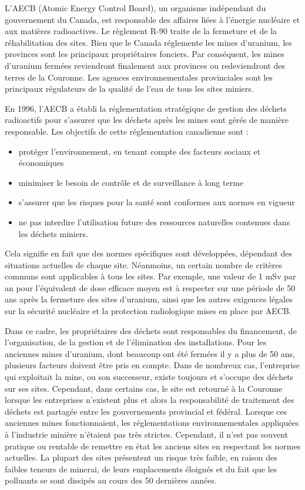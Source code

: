 \documentclass{article}
\begin{document}
L'AECB (Atomic Energy Control Board), un organisme indépendant du gouvernement du Canada, est responsable des affaires liées à l'énergie nucléaire et aux matières radioactives. Le règlement R-90 traite de la fermeture et de la réhabilitation des sites. Bien que le Canada réglemente les mines d'uranium, les provinces sont les principaux propriétaires fonciers. Par conséquent, les mines d'uranium fermées reviendront finalement aux provinces ou redeviendront des terres de la Couronne. Les agences environnementales provinciales sont les principaux régulateurs de la qualité de l'eau de tous les sites miniers.

En 1996, l'AECB a établi la réglementation stratégique de gestion des déchets radioactifs pour s'assurer que les déchets après les mines sont gérés de manière responsable. Les objectifs de cette réglementation canadienne sont :
\begin{itemize}
    \item protéger l'environnement, en tenant compte des facteurs sociaux et économiques
    \item minimiser le besoin de contrôle et de surveillance à long terme
    \item s'assurer que les risques pour la santé sont conformes aux normes en vigueur 
    \item ne pas interdire l'utilisation future des ressources naturelles contenues dans les déchets miniers.
\end{itemize}

Cela signifie en fait que des normes spécifiques sont développées, dépendant des situations actuelles de chaque site. Néanmoins, un certain nombre de critères communs sont applicables à tous les sites. Par exemple, une valeur de 1 mSv par an pour l'équivalent de dose efficace moyen est à respecter sur une période de 50 ans après la fermeture des sites d'uranium, ainsi que les autres exigences légales sur la sécurité nucléaire et la protection radiologique mises en place par AECB.

Dans ce cadre, les propriétaires des déchets sont responsables du financement, de l'organisation, de la gestion et de l’élimination des installations. Pour les anciennes mines d'uranium, dont beaucoup ont été fermées il y a plus de 50 ans, plusieurs facteurs doivent être pris en compte. Dans de nombreux cas, l'entreprise qui exploitait la mine, ou son successeur, existe toujours et s'occupe des déchets sur ses sites. Cependant, dans certains cas, le site est retourné à la Couronne lorsque les entreprises n’existent plus et alors la responsabilité de traitement des déchets est partagée entre les gouvernements provincial et fédéral. Lorsque ces anciennes mines fonctionnaient, les réglementations environnementales appliquées à l'industrie minière n'étaient pas très strictes. Cependant, il n'est pas souvent pratique ou rentable de remettre en état les anciens sites en respectant les normes actuelles. La plupart des sites présentent un risque très faible, en raison des faibles teneurs de minerai, de leurs emplacements éloignés et du fait que les polluants se sont dissipés au cours des 50 dernières années.
\end{document}
